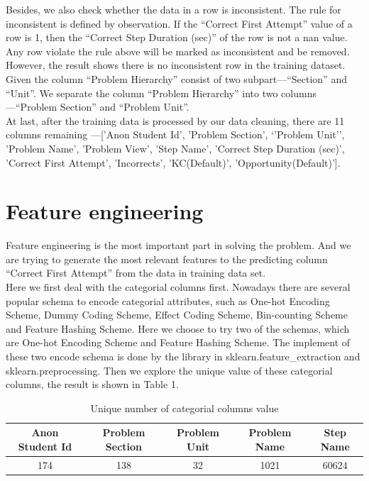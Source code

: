 \documentclass{article}
\begin{document}
Besides, we also check whether the data in a row is inconsistent. The rule for inconsistent is defined by observation. If the “Correct First Attempt” value of a row is 1, then the “Correct Step Duration (sec)” of the row is not a nan value. Any row violate the rule above will be marked as inconsistent and be removed. However, the result shows there is no inconsistent row in the training dataset.\\
Given the column “Problem Hierarchy” consist of two subpart—“Section” and “Unit”. We separate the column “Problem Hierarchy” into two columns—“Problem Section” and “Problem Unit”.\\
At last, after the training data is processed by our data cleaning, there are 11 columns remaining —['Anon Student Id', 'Problem Section’, ‘'Problem Unit’’, 'Problem Name', 'Problem View', 'Step Name', 'Correct Step Duration (sec)', 'Correct First Attempt', 'Incorrects', 'KC(Default)', 'Opportunity(Default)'].\\

\section{Feature engineering}
Feature engineering is the most important part in solving the problem. And we are trying to generate the most relevant features to the predicting column “Correct First Attempt” from the data in training data set.\\
Here we first deal with the categorial columns first. Nowadays there are several popular schema to encode categorial attributes, such as One-hot Encoding Scheme, Dummy Coding Scheme, Effect Coding Scheme, Bin-counting Scheme and Feature Hashing Scheme. Here we choose to try two of the schemas, which are One-hot Encoding Scheme and Feature Hashing Scheme. The implement of these two encode schema is done by the library in sklearn.feature\_extraction and sklearn.preprocessing. Then we explore the unique value of these categorial columns, the result is shown in Table 1.\\

\begin{table}[h]
\centering
\begin{tabular}{|c|c|c|c|c|}
\hline
Anon Student Id & Problem Section & Problem Unit & Problem Name & Step Name \\ \hline
174             & 138             & 32           & 1021         & 60624     \\ \hline
\end{tabular}
\caption{Unique number of categorial columns value}
\label{tab:my-table}
\end{table}
\end{document}
